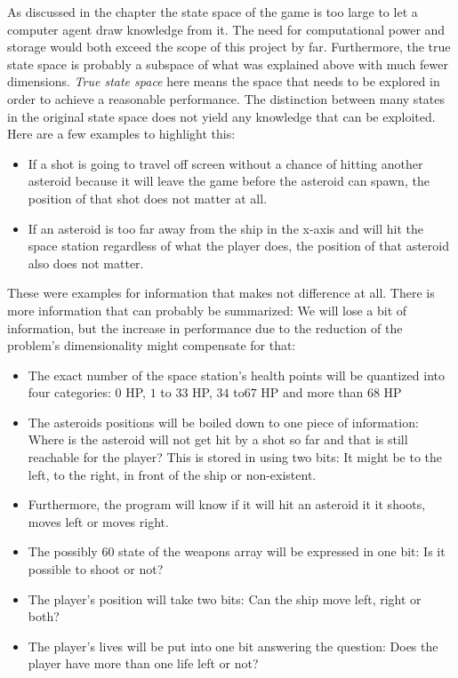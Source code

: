 \documentclass[a4paper,10pt]{article}
\begin{document}
As discussed in the chapter  the state space of the game is too large to let a computer agent draw knowledge from it.
The need for computational power and storage would both exceed the scope of this project by far.
Furthermore, the true state space is probably a subspace of what was explained above with much fewer dimensions.
\emph{True state space} here means the space that needs to be explored in order to achieve a reasonable performance. 
The distinction between many states in the original state space does not yield any knowledge that can be exploited.
Here are a few examples to highlight this:
\begin{itemize}
 \item If a shot is going to travel off screen without a chance of hitting another asteroid because it will leave the game before the asteroid can spawn, the position of that shot does not matter at all.
 \item If an asteroid is too far away from the ship in the x-axis and will hit the space station regardless of what the player does, the position of that asteroid also does not matter.
\end{itemize}
These were examples for information that makes not difference at all.
There is more information that can probably be summarized: We will lose a bit of information, but the increase in performance due to the reduction of the problem's dimensionality might compensate for that:
\begin{itemize}
 \item The exact number of the space station's health points will be quantized into four categories: $0$ HP, $1$ to $33$ HP, $34$ to$ 67$ HP and more than $68$ HP %
 \item The asteroids positions will be boiled down to one piece of information: Where is the asteroid will not get hit by a shot so far and that is still reachable for the player? 
 This is stored in using two bits: It might be to the left, to the right, in front of the ship or non-existent. %
 \item Furthermore, the program will know if it will hit an asteroid it it shoots, moves left or moves right. %
 \item The possibly $60$ state of the weapons array will be expressed in one bit: Is it possible to shoot or not? %
 \item The player's position will take two bits: Can the ship move left, right or both? %
 \item The player's lives will be put into one bit answering the question: Does the player have more than one life left or not? %
\end{itemize}
\end{document}
